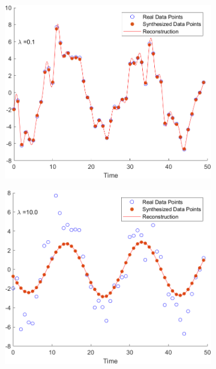 \documentclass{article}
\begin{document}
\begin{figure}[h]
\centering
   \begin{subfigure}{0.45\linewidth}
   \centering
   \includegraphics[width=\linewidth]{task41.png}
   \caption{}
   \label{fig:1} 
\end{subfigure}
\hfill
\begin{subfigure}{0.45\linewidth}
   \centering
   \includegraphics[width=\linewidth]{task42.png}
   \caption{}
   \label{fig:2}
\end{subfigure}

\end{figure}
\end{document}
